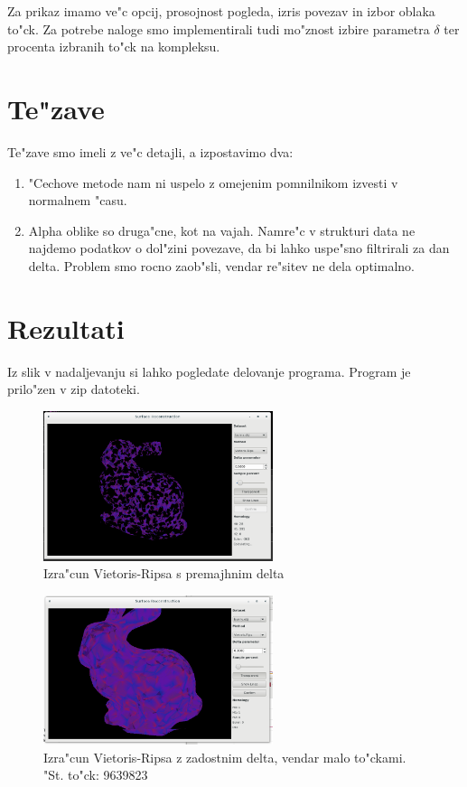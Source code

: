 \documentclass[11pt]{article}
\begin{document}
Za prikaz imamo ve"c opcij, prosojnost pogleda, izris povezav in izbor oblaka to"ck. Za potrebe naloge smo implementirali tudi mo"znost izbire parametra $\delta$ ter procenta izbranih to"ck na kompleksu.

\section{Te"zave}

Te"zave smo imeli z ve"c detajli, a izpostavimo dva:

\begin{enumerate}
\item "Cechove metode nam ni uspelo z omejenim pomnilnikom izvesti v normalnem "casu.
\item Alpha oblike so druga"cne, kot na vajah. Namre"c v strukturi data ne najdemo podatkov o dol"zini povezave, da bi lahko uspe"sno filtrirali za dan delta. Problem smo rocno zaob"sli, vendar re"sitev ne dela optimalno.
\end{enumerate}

\section{Rezultati}

Iz slik v nadaljevanju si lahko pogledate delovanje programa. Program je prilo"zen v zip datoteki.

\begin{figure}[htb]
    \centering
    \includegraphics[width=0.6\textwidth]{vr_long.png}
    \caption{Izra"cun Vietoris-Ripsa s premajhnim delta}
    \label{fig:vr1}
\end{figure}


\begin{figure}[htb]
    \centering
    \includegraphics[width=0.6\textwidth]{vr_full_9639823.png}
    \caption{Izra"cun Vietoris-Ripsa z zadostnim delta, vendar malo to"ckami. "St. to"ck: 9639823}
    \label{fig:vr2}
\end{figure}
\end{document}
